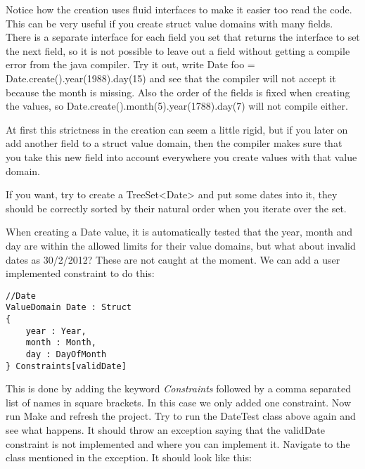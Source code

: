 Notice how the creation uses fluid interfaces to make it easier too
read the code. This can be very useful if you create struct value
domains with many fields. There is a separate interface for each field
you set that returns the interface to set the next field, so it is
not possible to leave out a field without getting a compile error
from the java compiler. Try it out, write Date foo = Date.create().year(1988).day(15)
and see that the compiler will not accept it because the month is
missing. Also the order of the fields is fixed when creating the values,
so Date.create().month(5).year(1788).day(7) will not compile either.

At first this strictness in the creation can seem a little rigid,
but if you later on add another field to a struct value domain, then
the compiler makes sure that you take this new field into account
everywhere you create values with that value domain.

If you want, try to create a TreeSet<Date> and put some dates into
it, they should be correctly sorted by their natural order when you
iterate over the set.

When creating a Date value, it is automatically tested that the year,
month and day are within the allowed limits for their value domains,
but what about invalid dates as 30/2/2012? These are not caught at
the moment. We can add a user implemented constraint to do this:

\begin{lstlisting}[basicstyle={\scriptsize}]
//Date
ValueDomain Date : Struct
{
	year : Year,
	month : Month,
	day : DayOfMonth
} Constraints[validDate]
\end{lstlisting}


This is done by adding the keyword \emph{Constraints }followed by
a comma separated list of names in square brackets. In this case we
only added one constraint. Now run Make and refresh the project. Try
to run the DateTest class above again and see what happens. It should
throw an exception saying that the validDate constraint is not implemented
and where you can implement it. Navigate to the class mentioned in
the exception. It should look like this:

